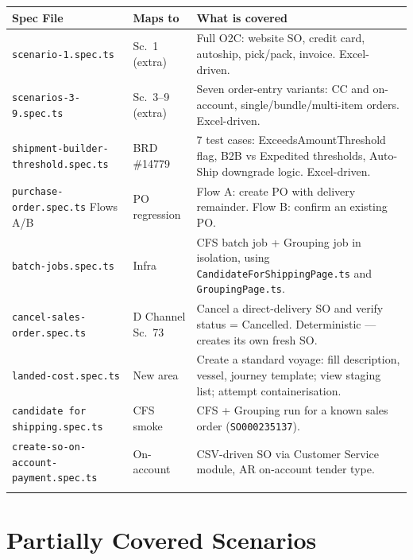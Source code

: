 \documentclass[a4paper,11pt]{article}
\begin{document}
\vspace{0.2cm}
\begin{longtable}{p{} p{} p{}}
\toprule
\textbf{Spec File} & \textbf{Maps to} & \textbf{What is covered} \\
\midrule
\endhead
\texttt{scenario-1.spec.ts} & Sc.\ 1 (extra) & Full O2C: website SO, credit card, autoship, pick/pack, invoice. Excel-driven. \\\relax
\cmidrule{1-3}
\texttt{scenarios-3-9.spec.ts} & Sc.\ 3--9 (extra) & Seven order-entry variants: CC and on-account, single/bundle/multi-item orders. Excel-driven. \\\relax
\cmidrule{1-3}
\texttt{shipment-builder-threshold.spec.ts} & BRD \#14779 & 7 test cases: ExceedsAmountThreshold flag, B2B vs Expedited thresholds, Auto-Ship downgrade logic. Excel-driven. \\\relax
\cmidrule{1-3}
\texttt{purchase-order.spec.ts} Flows A/B & PO regression & Flow A: create PO with delivery remainder. Flow B: confirm an existing PO. \\\relax
\cmidrule{1-3}
\texttt{batch-jobs.spec.ts} & Infra & CFS batch job + Grouping job in isolation, using \texttt{CandidateForShippingPage.ts} and \texttt{GroupingPage.ts}. \\\relax
\cmidrule{1-3}
\texttt{cancel-sales-order.spec.ts} & D Channel Sc.\ 73 & Cancel a direct-delivery SO and verify status = Cancelled. Deterministic — creates its own fresh SO. \\\relax
\cmidrule{1-3}
\texttt{landed-cost.spec.ts} & New area & Create a standard voyage: fill description, vessel, journey template; view staging list; attempt containerisation. \\\relax
\cmidrule{1-3}
\texttt{candidate for shipping.spec.ts} & CFS smoke & CFS + Grouping run for a known sales order (\texttt{SO000235137}). \\\relax
\cmidrule{1-3}
\texttt{create-so-on-account-payment.spec.ts} & On-account & CSV-driven SO via Customer Service module, AR on-account tender type. \\\relax
\cmidrule{1-3}
\bottomrule
\end{longtable}

\newpage

\section{Partially Covered Scenarios}
\end{document}
